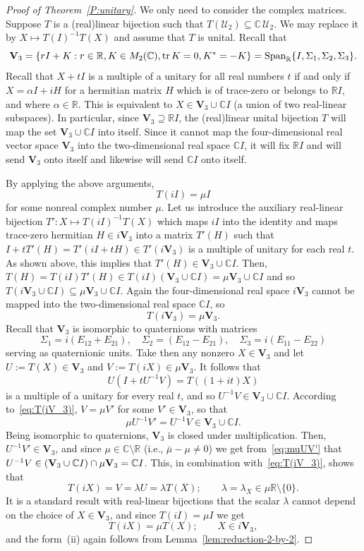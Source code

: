 \documentclass[11pt]{article}
\numberwithin{equation}{section}
\def\IC{{\mathbb C}}
\def\IR{{\mathbb R}}
\def\bV{{\mathbf V}}
\def\tr{\mathop{\rm tr}}
\def\span{{\mathop{\mathrm{Span}}\nolimits}}
\def\bV{{\mathbf V}}
\begin{document}
\begin{proof}[Proof of Theorem~\ref{P:unitary}] We only need to consider the complex matrices. Suppose $T$ is a (real)linear bijection such that $T({\mathcal U}_2)\subseteq \IC\,{\mathcal U}_2$.
We may replace it by  $X \mapsto T(I)^{-1}T(X)$ and assume that $T$ is unital.
Recall that
$$\bV_3= \{rI + K : r \in \IR, K \in M_2(\IC), \tr K = 0, K^* = -K \}=\span_{\IR}\{I,\Sigma_1,\Sigma_2,\Sigma_3\}.$$
Recall
that $X+tI$
is a multiple of a unitary for all real numbers $t$ if and only if
$X = \alpha I + iH$ for a hermitian matrix $H$   which is of trace-zero or belongs to $\IR I$, and where $\alpha\in\IR$.
This is equivalent to  $X\in\bV_3\cup\IC I$ (a union of two real-linear subspaces). In particular,
since $\bV_3\supseteq\IR I$,
 the (real)linear unital  bijection  $T$  will map the set $\bV_3\cup\IC I$ into itself.
Since  it cannot map the four-dimensional real vector space $\bV_3$ into the two-dimensional real space $\IC I$, it
will  fix $\IR I$  and  will send $\bV_3$ onto itself and likewise will send $\IC I$ onto itself.


By applying the above arguments,
$$T(iI)=\mu I$$ for some nonreal complex number $\mu$.
Let us introduce the auxiliary real-linear bijection $T'\colon X\mapsto T(iI)^{-1}T(X)$ which maps $iI$ into the identity and maps  trace-zero hermitian  $H\in i\bV_3$ into a matrix $T'(H)$ such that $I+t T'(H)=T'(iI+tH)\in T'(i\bV_3)$ is a multiple of unitary for each real $t$. As shown above, this implies that $T'(H)\in\bV_3\cup\IC I$. Then, $T(H)=T(iI)T'(H)\in T(iI)(\bV_3\cup\IC I)=\mu \bV_3\cup\IC I$ and so $T(i\bV_3\cup\IC I)\subseteq\mu\bV_3\cup \IC I$. Again the four-dimensional real space $i\bV_3$ cannot be mapped into the two-dimensional real space $\IC I$, so
\begin{equation}\label{eq:T(iV_3)}
 T(i\bV_3)=\mu \bV_3.
\end{equation}
Recall
that $\bV_3$ is isomorphic to quaternions with  matrices
\[
\Sigma_1 =i(E_{12} + E_{21}) ,\quad \Sigma_2 = (E_{12} - E_{21}),\quad \Sigma_3 = i(E_{11} - E_{22})
\]
serving as quaternionic units. Take then any nonzero
$X\in\bV_3$ and let $U:=T(X)\in\bV_3$ and $V:=T(iX)\in\mu\bV_3$. It follows that
$$U(I+t U^{-1} V)=T((1+it)X)$$
is a multiple of a unitary for every real $t$, and so $U^{-1} V\in\bV_3\cup\IC I$. According to~\eqref{eq:T(iV_3)}, $V=\mu V'$ for some $V'\in\bV_3$, so that
\begin{equation}\label{eq:muUV'}
 \mu U^{-1} V'=U^{-1} V\in\bV_3\cup\IC I.
\end{equation}
Being isomorphic to quaternions, $\bV_3$ is closed under multiplication. Then, $U^{-1} V'\in\bV_3$, and since $\mu\in\IC\setminus\IR$ (i.e., $\bar{\mu}-\mu\neq0$)  we get from~\eqref{eq:muUV'} that $U^{-1} V\in({\bf V}_3\cup\IC I)\cap \mu{\bf V}_3=\IC I$. This, in combination with~\eqref{eq:T(iV_3)}, shows that
$$T(iX)=V=\lambda U=\lambda T(X);\qquad \lambda=\lambda_X\in\mu\IR\setminus\{0\}.$$
It is a standard result with real-linear bijections that the scalar $\lambda$ cannot depend on the choice of $X\in\bV_3$, and since $T(iI)=\mu I$ we get
$$T(iX)=\mu T(X);\qquad X\in i\bV_3,$$
and the form~(ii) again follows from Lemma~\ref{lem:reduction-2-by-2}.


\end{proof}
\end{document}
